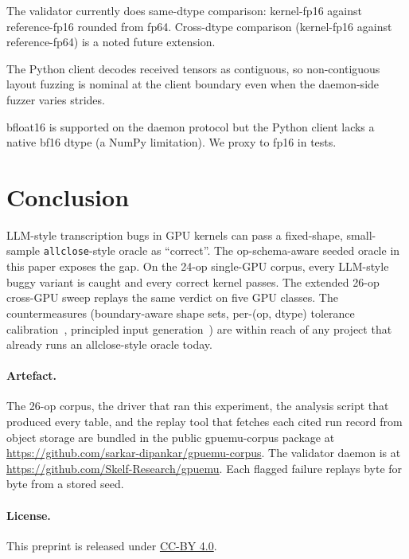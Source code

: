 \documentclass[runningheads]{llncs}
\begin{document}
The validator currently does same-dtype comparison: kernel-fp16
against reference-fp16 rounded from fp64. Cross-dtype comparison
(kernel-fp16 against reference-fp64) is a noted future extension.

The Python client decodes received tensors as contiguous, so
non-contiguous layout fuzzing is nominal at the client boundary even
when the daemon-side fuzzer varies strides.

bfloat16 is supported on the daemon protocol but the Python client
lacks a native bf16 dtype (a NumPy limitation). We proxy to fp16 in
tests.

\section{Conclusion}
\label{sec:conclusion}

LLM-style transcription bugs in GPU kernels can pass a fixed-shape,
small-sample \texttt{allclose}-style oracle as ``correct''. The
op-schema-aware seeded oracle in this paper exposes the gap. On the
24-op single-GPU corpus, every LLM-style buggy variant is caught and
every correct kernel passes. The extended 26-op cross-GPU sweep
replays the same verdict on five GPU classes. The countermeasures
(boundary-aware shape sets, per-(op, dtype) tolerance
calibration~\cite{gpuemuP2}, principled input
generation~\cite{gpuemuP3}) are within reach of any project that
already runs an allclose-style oracle today.

\paragraph{Artefact.}
The 26-op corpus, the driver that ran this experiment, the analysis
script that produced every table, and the replay tool that fetches
each cited run record from object storage are bundled in the public
\textsf{gpuemu-corpus} package at
\url{https://github.com/sarkar-dipankar/gpuemu-corpus}. The validator
daemon is at \url{https://github.com/Skelf-Research/gpuemu}. Each
flagged failure replays byte for byte from a stored seed.

\paragraph{License.}
This preprint is released under
\href{https://creativecommons.org/licenses/by/4.0/}{CC-BY 4.0}.



\end{document}
